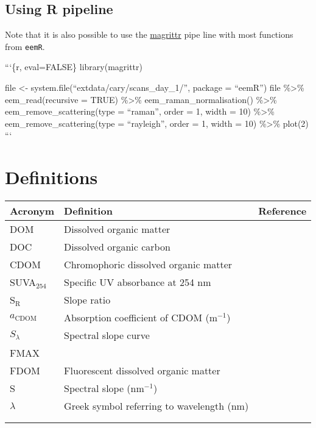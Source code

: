 \documentclass[]{book}
\theoremstyle{definition}
\theoremstyle{definition}
\theoremstyle{remark}
\begin{document}
\section{Using R pipeline}\label{using-r-pipeline}

Note that it is also possible to use the
\href{https://cran.r-project.org/web/packages/magrittr/vignettes/magrittr.html}{magrittr}
pipe line with most functions from \texttt{eemR}.

```\{r, eval=FALSE\} library(magrittr)

file \textless{}- system.file(``extdata/cary/scans\_day\_1/'', package =
``eemR'') file \%\textgreater{}\% eem\_read(recursive = TRUE)
\%\textgreater{}\% eem\_raman\_normalisation() \%\textgreater{}\%
eem\_remove\_scattering(type = ``raman'', order = 1, width = 10)
\%\textgreater{}\% eem\_remove\_scattering(type = ``rayleigh'', order =
1, width = 10) \%\textgreater{}\% plot(2) ```

\chapter{Definitions}\label{definitions}

\begin{longtable}[]{@{}lll@{}}
\toprule
Acronym & Definition & Reference\tabularnewline
\midrule
\endhead
DOM & Dissolved organic matter &\tabularnewline
DOC & Dissolved organic carbon &\tabularnewline
CDOM & Chromophoric dissolved organic matter &\tabularnewline
SUVA\(_{254}\) & Specific UV absorbance at 254 nm &
\citet{Weishaar2003}\tabularnewline
S\(_\text{R}\) & Slope ratio & \citet{Helms2008}\tabularnewline
\(a_\text{CDOM}\) & Absorption coefficient of CDOM (m\(^{-1}\))
&\tabularnewline
\(S_\lambda\) & Spectral slope curve &
\citet{Loiselle2009}\tabularnewline
FMAX & &\tabularnewline
FDOM & Fluorescent dissolved organic matter &\tabularnewline
S & Spectral slope (nm\(^{-1}\)) &\tabularnewline
\(\lambda\) & Greek symbol referring to wavelength (nm) &\tabularnewline
& &\tabularnewline
& &\tabularnewline
\bottomrule
\end{longtable}


\end{document}
